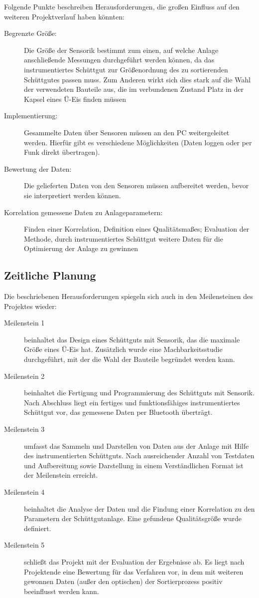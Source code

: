 Folgende Punkte beschreiben Herausforderungen, die großen Einfluss auf den weiteren Projektverlauf haben könnten:
\begin{description}
	\item [Begrenzte Größe:] Die Größe der Sensorik bestimmt zum einen, auf welche Anlage anschließende Messungen durchgeführt werden können, da das instrumentiertes Schüttgut zur Größenordnung des zu sortierenden Schüttgutes passen muss. Zum Anderen wirkt sich dies stark auf die Wahl der verwendeten Bauteile aus, die im verbundenen Zustand Platz in der Kapsel eines Ü-Eis finden müssen
	\item [Implementierung:] Gesammelte Daten über Sensoren müssen an den PC weitergeleitet werden. Hierfür gibt es verschiedene Möglichkeiten (Daten loggen oder per Funk direkt übertragen).
	\item [Bewertung der Daten:] Die gelieferten Daten von den Sensoren müssen aufbereitet werden, bevor sie interpretiert werden können.
	\item [Korrelation gemessene Daten zu Anlageparametern:] Finden einer Korrelation, Definition eines Qualitätsmaßes; Evaluation der Methode, durch instrumentiertes Schüttgut weitere Daten für die Optimierung der Anlage zu gewinnen 
\end{description} 

\subsection{Zeitliche Planung}
Die beschriebenen Herausforderungen spiegeln sich auch in den Meilensteinen des Projektes wieder:
\begin{description}
	\item [Meilenstein 1] beinhaltet das Design eines Schüttguts mit Sensorik, das die maximale Größe eines Ü-Eis hat. Zusätzlich wurde eine Machbarkeitsstudie durchgeführt, mit der die Wahl der Bauteile begründet werden kann.
	\item [Meilenstein 2] beinhaltet die Fertigung und Programmierung des Schüttguts mit Sensorik. Nach Abschluss liegt ein fertiges und funktionsfähiges instrumentiertes Schüttgut vor, das gemessene Daten per Bluetooth überträgt.
	\item [Meilenstein 3] umfasst das Sammeln und Darstellen von Daten aus der Anlage mit Hilfe des instrumentierten Schüttguts. Nach ausreichender Anzahl von Testdaten und Aufbereitung sowie Darstellung in einem Verständlichen Format ist der Meilenstein erreicht.
	\item [Meilenstein 4] beinhaltet die Analyse der Daten und die Findung einer Korrelation zu den Parametern der Schüttgutanlage. Eine gefundene Qualitätsgröße wurde definiert.
	\item [Meilenstein 5] schließt das Projekt mit der Evaluation der Ergebnisse ab. Es liegt nach Projektende eine Bewertung für das Verfahren vor, in dem mit  weiteren gewonnen Daten (außer den optischen) der Sortierprozess positiv beeinflusst werden kann.
\end{description}
	
